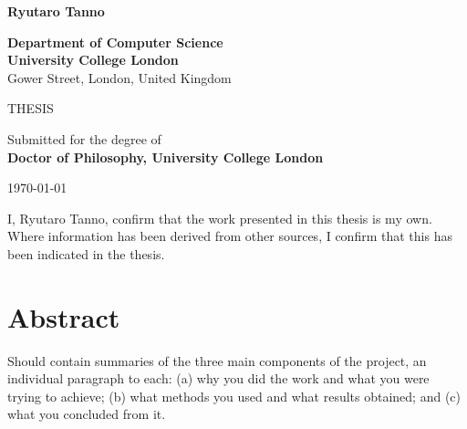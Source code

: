 \documentclass[12pt,a4paper,twoside]{book}
\begin{document}
\begin{titlepage}
\begin{center}
{\vspace{5em}
\LARGE \textbf{Ryutaro Tanno}
 \vspace{3em}%
\begin{center}%
	\large
	\textbf{Department of Computer Science} \\
	\textbf{University College London}\\
	Gower Street, London, United Kingdom\\
\end{center}%
\vspace{4em}%


\begin{center}%
	\large THESIS %
	\vspace{1em}
\end{center}%

 \begin{center}%
 	\large
	Submitted for the degree of \\
	\textbf{Doctor of Philosophy, University College London} \\
\end{center}%
\vspace{1em}%



 \vfill
% 
% 

{\Large \today}

}
\end{center}
\end{titlepage}


\clearpage


I, Ryutaro Tanno, confirm that the work presented in this thesis is my own. Where information has been derived from other sources, I confirm that this has been indicated in the thesis.

\clearpage


\chapter*{Abstract}
Should contain summaries of the three main components of the project, an individual paragraph to each: (a) why you did the work and what you were trying to achieve; (b) what methods you used and what results obtained; and (c) what you concluded from it. 
\end{document}
